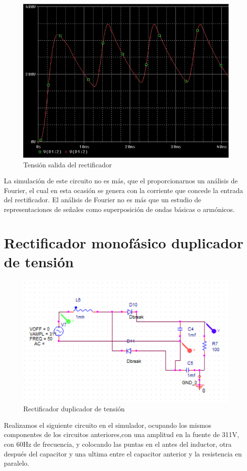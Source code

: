 \documentclass[12pt,a4paper]{article}
\begin{document}
\begin{figure}[hbtp]
\centering
\includegraphics[scale=0.5]{6.png}
\caption{Tensión salida del rectificador}
\end{figure}
La simulación de este circuito no es más, que el proporcionarnos un análisis de Fourier, el cual en esta ocasión se genera con la corriente que concede la entrada del rectificador.
El análisis de Fourier no es más que un estudio de representaciones de señales como superposición de ondas básicas o armónicos.

\newpage
\section{Rectificador monofásico duplicador de tensión}
\begin{figure}[hbtp]
\centering
\includegraphics[scale=0.8]{7.png}
\caption{Rectificador duplicador de tensión}
\end{figure}
Realizamos el siguiente circuito en el simulador, ocupando los mismos componentes de los circuitos anteriores,con una amplitud en la fuente de 311V, con 60Hz de frecuencia, y colocando las puntas en el antes del inductor, otra después del capacitor y una ultima entre el capacitor anterior y la resistencia en paralelo.
\end{document}
